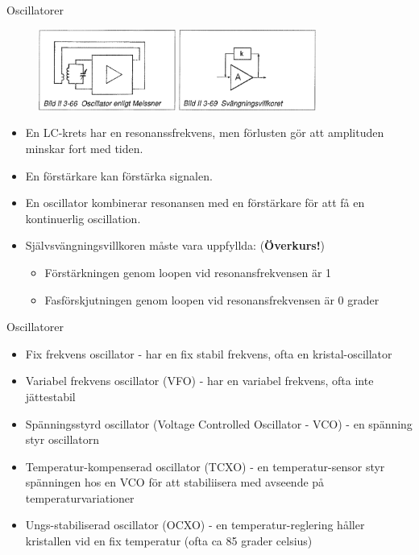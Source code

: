 \documentclass{beamer}
\begin{document}
\begin{frame}{Oscillatorer}

\begin{figure}[h]
\includegraphics[width=0.4\textwidth]{images/bild_2_3-66}
\includegraphics[width=0.4\textwidth]{images/bild_2_3-69}
\end{figure}

\begin{itemize}
\item En LC-krets har en resonanssfrekvens, men förlusten gör att amplituden
  minskar fort med tiden.
\item En förstärkare kan förstärka signalen.
\item En oscillator kombinerar resonansen med en förstärkare för att få en kontinuerlig oscillation.
\item Självsvängningsvillkoren måste vara uppfyllda: (\textbf{Överkurs!})
  \begin{itemize}
  \item Förstärkningen genom loopen vid resonansfrekvensen är 1
  \item Fasförskjutningen genom loopen vid resonansfrekvensen är 0 grader
  \end{itemize}
\end{itemize}
\end{frame}

\begin{frame}{Oscillatorer}
  \begin{itemize}
    \item Fix frekvens oscillator - har en fix stabil frekvens, ofta en kristal-oscillator
    \item Variabel frekvens oscillator (VFO) - har en variabel frekvens, ofta inte jättestabil
    \item Spänningsstyrd oscillator (Voltage Controlled Oscillator - VCO) - en spänning styr oscillatorn
    \item Temperatur-kompenserad oscillator (TCXO) - en temperatur-sensor styr spänningen hos en VCO för att stabiliisera med avseende på temperaturvariationer
    \item Ungs-stabiliserad oscillator (OCXO) - en temperatur-reglering håller kristallen vid en fix temperatur (ofta ca 85 grader celsius)
  \end{itemize}
\end{frame}
\end{document}
